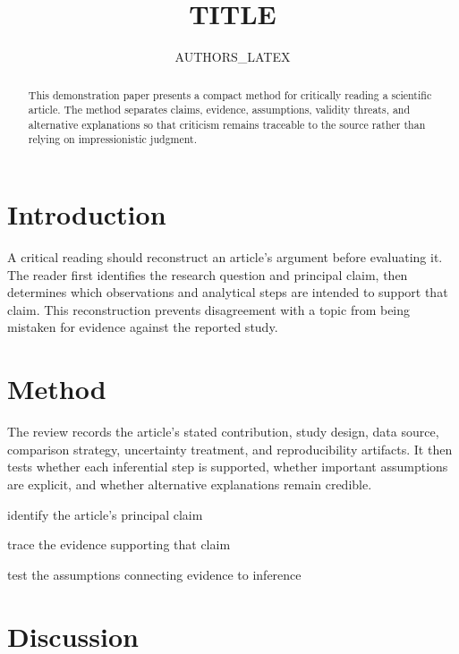 \documentclass{template/ieeetj}
\title{{{TITLE}}}
\author{{{AUTHORS_LATEX}}}
\affil{Independent researcher}
\begin{document}
\currentdate{\today}

\maketitle

\begin{abstract}
This demonstration paper presents a compact method for critically reading a
scientific article. The method separates claims, evidence, assumptions,
validity threats, and alternative explanations so that criticism remains
traceable to the source rather than relying on impressionistic judgment.
\end{abstract}

\section{Introduction}

A critical reading should reconstruct an article's argument before evaluating
it. The reader first identifies the research question and principal claim,
then determines which observations and analytical steps are intended to
support that claim. This reconstruction prevents disagreement with a topic
from being mistaken for evidence against the reported study.

\section{Method}

The review records the article's stated contribution, study design, data
source, comparison strategy, uncertainty treatment, and reproducibility
artifacts. It then tests whether each inferential step is supported, whether
important assumptions are explicit, and whether alternative explanations
remain credible.

\begin{enumpar}
  \item identify the article's principal claim
  \item trace the evidence supporting that claim
  \item test the assumptions connecting evidence to inference
\end{enumpar}

\section{Discussion}
\end{document}
